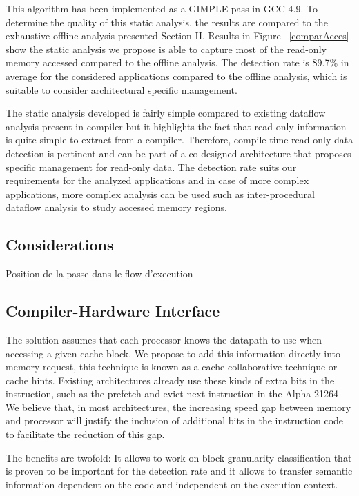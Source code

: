 \documentclass[sigconf]{acmart}
\begin{document}
This algorithm has been implemented as a GIMPLE pass in GCC 4.9. To determine the quality of this static analysis, the results are compared to the exhaustive offline analysis presented Section II. Results in Figure ~\ref{comparAcces} show the static analysis we propose is able to capture most of the read-only memory accessed compared to the offline analysis. The detection rate is 89.7\% in average for the considered applications compared to the offline analysis, which is suitable to consider architectural specific management. 

The static analysis developed is fairly simple compared to existing dataflow analysis present in compiler but it highlights the fact that read-only information is quite simple to extract from a compiler. Therefore, compile-time read-only data detection is pertinent and can be part of a co-designed architecture that proposes specific management for read-only data. The detection rate suits our requirements for the analyzed applications and in case of more complex applications, more complex analysis can be used such as inter-procedural dataflow analysis to study accessed memory regions. 

\subsection{Considerations}
Position de la passe dans le flow d'execution 


\subsection{Compiler-Hardware Interface}

The solution assumes that each processor knows the datapath to use
when accessing a given cache block. We propose to add this information
directly into memory request, this technique is known as a cache
collaborative technique or cache hints. Existing architectures already use these kinds
of extra bits in the instruction, such as the prefetch and evict-next
instruction in the Alpha 21264 	
We believe that, in most architectures, the increasing speed gap between memory and
processor will justify the inclusion of additional bits in the
instruction code to facilitate the reduction of this gap.

The benefits are twofold: It allows to work on block granularity
classification that is proven to be important for the detection rate
and it allows to transfer semantic information dependent on the code and
independent on the execution context.
\end{document}
